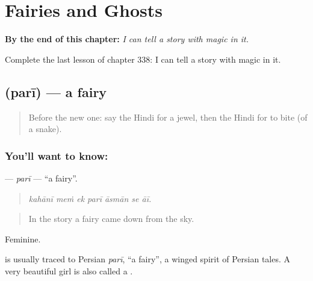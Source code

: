 
\chapter{Fairies and Ghosts}
\label{ch:hi-fairies-and-ghosts}

\begin{chapteropening}
\textbf{By the end of this chapter:} \emph{I can tell a story with magic in it.}

Complete the last lesson of chapter 338: I can tell a story with magic in it.
\end{chapteropening}

\section[\texorpdfstring{\hi{परी} (parī)}{परी (parī)}]{ (parī) — a fairy}

\label{lesson:HI-C338-pari}



\begin{quote}
Before the new one: say the Hindi for a jewel, then the Hindi for to bite (of a snake).
\end{quote}

\subsection*{You'll want to know: }
\textbf{} — \emph{parī} — \textquotedblleft{}a fairy\textquotedblright{}.

\begin{quote}
      
\end{quote}

\begin{quote}
\emph{kahānī meṁ ek parī āsmān se āī.}
\end{quote}

\begin{quote}
In the story a fairy came down from the sky.
\end{quote}

Feminine.

\begin{cousinweb}
is usually traced to Persian \emph{parī}, \textquotedblleft{}a fairy\textquotedblright{}, a winged spirit of Persian tales. A very beautiful girl is also called a \textbf{}.
\end{cousinweb}

